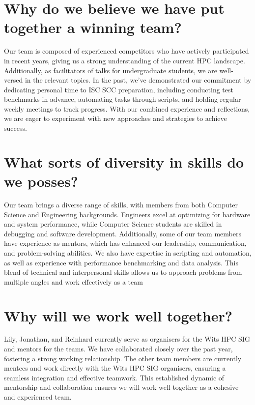 \documentclass[10pt, onecolumn]{IEEEtran}
\begin{document}
\section{Why do we believe we have put together a winning team?}
\noindent
Our team is composed of experienced competitors who have actively participated in recent years, giving us a strong understanding of the current HPC landscape. Additionally, as facilitators of talks for undergraduate students, we are well-versed in the relevant topics. In the past, we've demonstrated our commitment by dedicating personal time to ISC SCC preparation, including conducting test benchmarks in advance, automating tasks through scripts, and holding regular weekly meetings to track progress. With our combined experience and reflections, we are eager to experiment with new approaches and strategies to achieve success.
\section{What sorts of diversity in skills do we posses?}
\noindent
Our team brings a diverse range of skills, with members from both Computer Science and Engineering backgrounds. Engineers excel at optimizing for hardware and system performance, while Computer Science students are skilled in debugging and software development. Additionally, some of our team members have experience as mentors, which has enhanced our leadership, communication, and problem-solving abilities. We also have expertise in scripting and automation, as well as experience with performance benchmarking and data analysis. This blend of technical and interpersonal skills allows us to approach problems from multiple angles and work effectively as a team
\section{Why will we work well together?} 
\noindent
Lily, Jonathan, and Reinhard currently serve as organisers for the Wits HPC SIG and mentors for the teams. We have collaborated closely over the past year, fostering a strong working relationship. The other team members are currently mentees and work directly with the Wits HPC SIG organisers, ensuring a seamless integration and effective teamwork. This established dynamic of mentorship and collaboration ensures we will work well together as a cohesive and experienced team.
\end{document}
